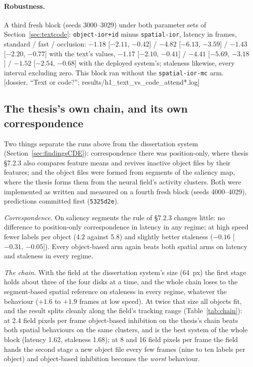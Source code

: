 \documentclass[11pt,a4paper]{article}
\newcommand{\src}[1]{\textcolor{blue!50!black}{\footnotesize\,[#1]}}
\newcommand{\src}[1]{}
\newcommand{\arm}[1]{\texttt{#1}}
\begin{document}
\paragraph{Robustness.} A third fresh block (seeds 3000--3029) under both
parameter sets of Section~\ref{sec:textcode}: \arm{object-ior+id} minus
\arm{spatial-ior}, latency in frames, standard / fast / occlusion:
$-1.18$ [$-2.11$, $-0.42$] / $-4.82$ [$-6.13$, $-3.59$] / $-1.43$ [$-2.20$, $-0.77$]
with the text's values, $-1.17$ [$-2.10$, $-0.41$] / $-4.41$ [$-5.69$, $-3.18$] /
$-1.52$ [$-2.54$, $-0.68$] with the deployed system's; staleness likewise, every
interval excluding zero. This block ran without the \arm{spatial-ior-mc} arm.
\src{dossier, ``Text or code?''; results/h1\_text\_vs\_code\_attend*.log}

\subsection{The thesis's own chain, and its own correspondence}
\label{sec:chain}
Two things separate the runs above from the dissertation system
(Section~\ref{sec:findingsCDE}): correspondence there was position-only, where
thesis \S7.2.3 also compares feature means and revives inactive object files by
their features; and the object files were formed from segments of the saliency
map, where the thesis forms them from the neural field's activity clusters. Both
were implemented as written and measured on a fourth fresh block (seeds
4000--4029), predictions committed first (\texttt{5325d2e}).

\emph{Correspondence.} On saliency segments the rule of \S7.2.3 changes little:
no difference to position-only correspondence in latency in any regime; at high
speed fewer labels per object (4.2 against 5.8) and slightly better staleness
($-0.16$ [$-0.31$, $-0.05$]). Every object-based arm again beats both spatial arms
on latency and staleness in every regime.

\emph{The chain.} With the field at the dissertation system's size (64~px) the
first stage holds about three of the four disks at a time, and the whole chain
loses to the segment-based spatial reference on staleness in every regime,
whatever the behaviour ($+1.6$ to $+1.9$ frames at low speed). At twice that
size all objects fit, and the result splits cleanly along the field's tracking
range (Table~\ref{tab:chain}): at 2.4 field pixels per frame object-based
inhibition on the thesis's chain beats both spatial behaviours on the same
clusters, and is the best system of the whole block (latency 1.62, staleness
1.68); at 8 and 16 field pixels per frame the field hands the second stage a new
object file every few frames (nine to ten labels per object) and object-based
inhibition becomes the \emph{worst} behaviour.
\end{document}
